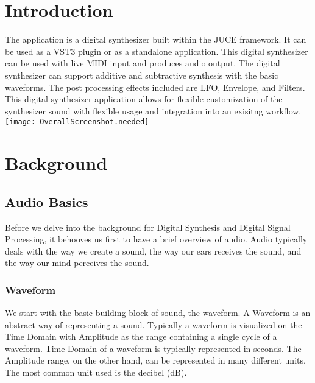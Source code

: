 \documentclass[a4paper,12pt]{report}
\begin{document}




\vspace*{\fill}
\begin{center}

\end{center}
\vfill
\thispagestyle{empty}
\newpage
\setcounter{page}{1}


\tableofcontents



\chapter{Introduction}

The application is a digital synthesizer built within the JUCE framework. It can be used as a VST3 plugin or as a standalone application. This digital synthesizer can be used with live MIDI input and produces audio output. The digital synthesizer can support additive and subtractive synthesis with the basic waveforms. The post processing effects included are LFO, Envelope, and Filters.
This digital synthesizer application allows for flexible customization of the synthesizer sound with flexible usage and integration into an exisitng workflow.
\texttt{[image: OverallScreenshot.needed]}
\chapter{Background}
\section{Audio Basics}
Before we delve into the background for Digital Synthesis and Digital Signal Processing, it behooves us first to have a brief overview of audio. Audio typically deals with the way we create a sound, the way our ears receives the sound, and the way our mind perceives the sound.

\subsection{Waveform}
We start with the basic building block of sound, the waveform. A Waveform is an abstract way of representing a sound. Typically a waveform is visualized on the Time Domain with Amplitude as the range containing a single cycle of a waveform. Time Domain of a waveform is typically represented in seconds. The Amplitude range, on the other hand, can be represented in many different units. The most common unit used is the decibel (dB). 
\end{document}
